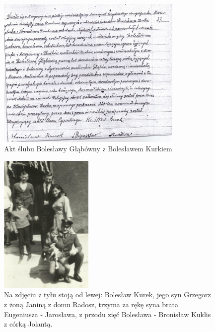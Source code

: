 \begin{figure}[!h]
\begin{center}
\includegraphics[width=0.8\textwidth]{zdjecia/akt_slubu_boleslawy_i_boleslawa_kurkow.jpg}
\caption{Akt ślubu Bolesławy Głąbówny z Bolesławem Kurkiem}
\label{rys:akt_slubu_boleslawy_i_boleslawa_kurkow}
\end{center}
\end{figure}

\begin{figure}[!h]
\begin{center}
\includegraphics[width=0.4\textwidth]{zdjecia/boleslaw_kurek_z_synem_i_zieciem.jpg}
\caption[Bolesław Kurek z synem, synową i zięciem]{Na zdjęciu z tyłu stoją od lewej: Bolesław Kurek, jego syn Grzegorz z żoną Janiną z domu Radosz, trzyma za rękę syna brata Eugeniusza - Jarosława, z przodu zięć Bolesława - Bronisław Kuklis z córką Jolantą.}
\label{rys:boleslaw_kurek_z_synem_i_zieciem}
\end{center}
\end{figure}

